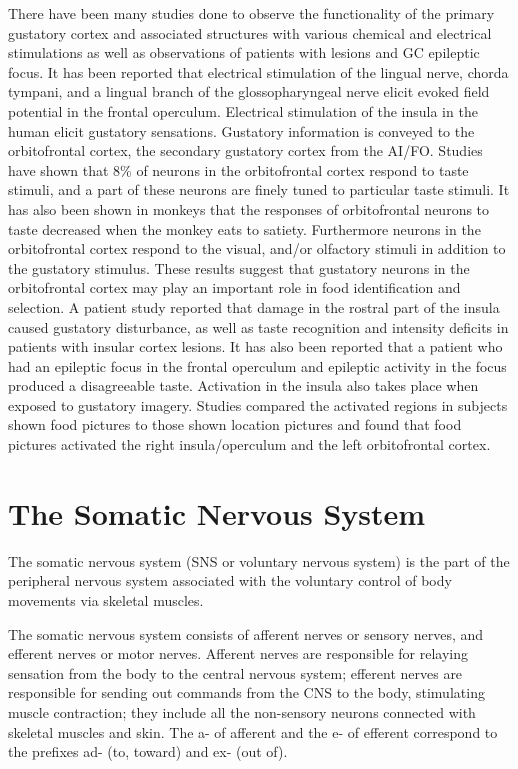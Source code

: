 There have been many studies done to observe the functionality of the primary gustatory cortex and associated structures with various chemical and electrical stimulations as well as observations of patients with lesions and GC epileptic focus. It has been reported that electrical stimulation of the lingual nerve, chorda tympani, and a lingual branch of the glossopharyngeal nerve elicit evoked field potential in the frontal operculum. Electrical stimulation of the insula in the human elicit gustatory sensations. Gustatory information is conveyed to the orbitofrontal cortex, the secondary gustatory cortex from the AI/FO. Studies have shown that 8\% of neurons in the orbitofrontal cortex respond to taste stimuli, and a part of these neurons are finely tuned to particular taste stimuli. It has also been shown in monkeys that the responses of orbitofrontal neurons to taste decreased when the monkey eats to satiety. Furthermore neurons in the orbitofrontal cortex respond to the visual, and/or olfactory stimuli in addition to the gustatory stimulus. These results suggest that gustatory neurons in the orbitofrontal cortex may play an important role in food identification and selection. A patient study reported that damage in the rostral part of the insula caused gustatory disturbance, as well as taste recognition and intensity deficits in patients with insular cortex lesions. It has also been reported that a patient who had an epileptic focus in the frontal operculum and epileptic activity in the focus produced a disagreeable taste. Activation in the insula also takes place when exposed to gustatory imagery. Studies compared the activated regions in subjects shown food pictures to those shown location pictures and found that food pictures activated the right insula/operculum and the left orbitofrontal cortex.

\hypertarget{the-somatic-nervous-system}{%
\chapter{The Somatic Nervous System}\label{the-somatic-nervous-system}}

The somatic nervous system (SNS or voluntary nervous system) is the part of the peripheral nervous system associated with the voluntary control of body movements via skeletal muscles.

The somatic nervous system consists of afferent nerves or sensory nerves, and efferent nerves or motor nerves. Afferent nerves are responsible for relaying sensation from the body to the central nervous system; efferent nerves are responsible for sending out commands from the CNS to the body, stimulating muscle contraction; they include all the non-sensory neurons connected with skeletal muscles and skin. The a- of afferent and the e- of efferent correspond to the prefixes ad- (to, toward) and ex- (out of).

